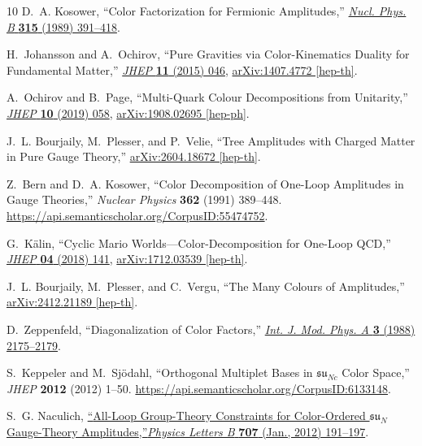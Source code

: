 \documentclass[12pt,a4paper]{article}\let\ifpdf\relax
\begin{document}
\begin{thebibliography}{10}
D.~A. Kosower, ``{Color Factorization for Fermionic Amplitudes},''
  \href{http://dx.doi.org/10.1016/0550-3213(89)90361-1}{{\em Nucl. Phys. B}
  {\bf 315} (1989)  391--418}.

H.~Johansson and A.~Ochirov, ``{Pure Gravities via Color-Kinematics Duality for
  Fundamental Matter},'' \href{http://dx.doi.org/10.1007/JHEP11(2015)046}{{\em
  JHEP} {\bf 11} (2015)  046}, \href{http://arxiv.org/abs/1407.4772}{{
  arXiv:1407.4772 [hep-th]}}.

A.~Ochirov and B.~Page, ``{Multi-Quark Colour Decompositions from Unitarity},''
  \href{http://dx.doi.org/10.1007/JHEP10(2019)058}{{\em JHEP} {\bf 10} (2019)
  058}, \href{http://arxiv.org/abs/1908.02695}{{ arXiv:1908.02695 [hep-ph]}}.

J.~L. Bourjaily, M.~Plesser, and P.~Velie, ``{Tree Amplitudes with Charged
  Matter in Pure Gauge Theory},'' \href{http://arxiv.org/abs/2604.18672}{{
  arXiv:2604.18672 [hep-th]}}.

Z.~Bern and D.~A. Kosower, ``{Color Decomposition of One-Loop Amplitudes in
  Gauge Theories},'' {\em Nuclear Physics} {\bf 362} (1991)  389--448.
  \url{https://api.semanticscholar.org/CorpusID:55474752}.

G.~K{\"a}lin, ``{Cyclic Mario Worlds---Color-Decomposition for One-Loop QCD},''
  \href{http://dx.doi.org/10.1007/JHEP04(2018)141}{{\em JHEP} {\bf 04} (2018)
  141}, \href{http://arxiv.org/abs/1712.03539}{{ arXiv:1712.03539 [hep-th]}}.

J.~L. Bourjaily, M.~Plesser, and C.~Vergu, ``{The Many Colours of
  Amplitudes},'' \href{http://arxiv.org/abs/2412.21189}{{ arXiv:2412.21189
  [hep-th]}}.

D.~Zeppenfeld, ``{Diagonalization of Color Factors},''
  \href{http://dx.doi.org/10.1142/S0217751X88000916}{{\em Int. J. Mod. Phys. A}
  {\bf 3} (1988)  2175--2179}.

S.~Keppeler and M.~Sj{\"o}dahl, ``{Orthogonal Multiplet Bases in
  $\mathfrak{su}_{Nc}$ Color Space},'' {\em JHEP} {\bf 2012} (2012)  1--50.
  \url{https://api.semanticscholar.org/CorpusID:6133148}.

S.~G. Naculich,
  \href{http://dx.doi.org/10.1016/j.physletb.2011.12.010}{``{All-Loop
  Group-Theory Constraints for Color-Ordered $\mathfrak{su}_{N}$ Gauge-Theory
  Amplitudes},''{\em Physics Letters B} {\bf 707} (Jan., 2012)  191--197}.


\end{thebibliography}
\end{document}
